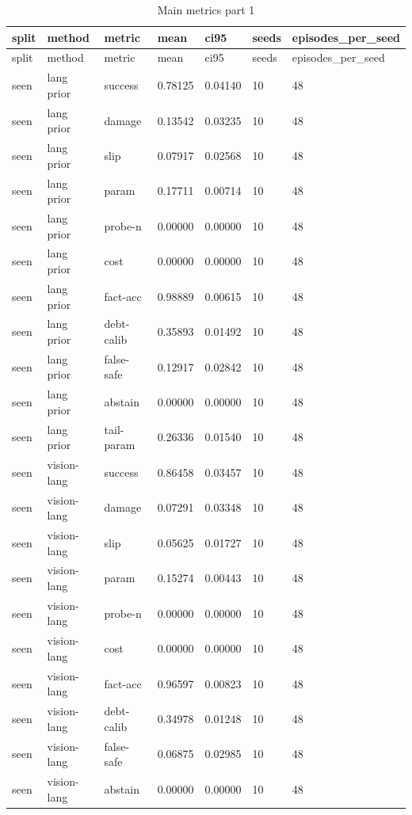\documentclass{article}
\begin{document}
\begin{center}
\tiny
\renewcommand{\arraystretch}{0.92}
\setlength{\tabcolsep}{3pt}
\begin{longtable}{lllllll}
\caption{Main metrics part 1}\label{tab:main-metrics-1}\\
\toprule
split & method & metric & mean & ci95 & seeds & episodes\_per\_seed \\
\midrule
\endfirsthead
\toprule
split & method & metric & mean & ci95 & seeds & episodes\_per\_seed \\
\midrule
\endhead
seen & lang prior & success & 0.78125 & 0.04140 & 10 & 48 \\
seen & lang prior & damage & 0.13542 & 0.03235 & 10 & 48 \\
seen & lang prior & slip & 0.07917 & 0.02568 & 10 & 48 \\
seen & lang prior & param & 0.17711 & 0.00714 & 10 & 48 \\
seen & lang prior & probe-n & 0.00000 & 0.00000 & 10 & 48 \\
seen & lang prior & cost & 0.00000 & 0.00000 & 10 & 48 \\
seen & lang prior & fact-acc & 0.98889 & 0.00615 & 10 & 48 \\
seen & lang prior & debt-calib & 0.35893 & 0.01492 & 10 & 48 \\
seen & lang prior & false-safe & 0.12917 & 0.02842 & 10 & 48 \\
seen & lang prior & abstain & 0.00000 & 0.00000 & 10 & 48 \\
seen & lang prior & tail-param & 0.26336 & 0.01540 & 10 & 48 \\
seen & vision-lang & success & 0.86458 & 0.03457 & 10 & 48 \\
seen & vision-lang & damage & 0.07291 & 0.03348 & 10 & 48 \\
seen & vision-lang & slip & 0.05625 & 0.01727 & 10 & 48 \\
seen & vision-lang & param & 0.15274 & 0.00443 & 10 & 48 \\
seen & vision-lang & probe-n & 0.00000 & 0.00000 & 10 & 48 \\
seen & vision-lang & cost & 0.00000 & 0.00000 & 10 & 48 \\
seen & vision-lang & fact-acc & 0.96597 & 0.00823 & 10 & 48 \\
seen & vision-lang & debt-calib & 0.34978 & 0.01248 & 10 & 48 \\
seen & vision-lang & false-safe & 0.06875 & 0.02985 & 10 & 48 \\
seen & vision-lang & abstain & 0.00000 & 0.00000 & 10 & 48 \\

\end{longtable}
\end{center}
\end{document}
